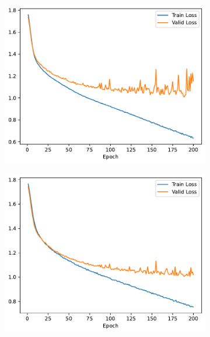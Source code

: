 \documentclass[a4paper, 12pt]{article}
\begin{document}
\begin{figure}[H]
    \centering
     \begin{subfigure}{0.30\textwidth}
        \includegraphics[width=\textwidth]{plot/mlp-training-loss-batch-64-lr-0.002-epochs-200-hidden-200-dropout-0.01-l2-0.0-layers-2-act-relu-opt-sgd-mom-0.0.pdf}
        \label{fig:lr_0.00}
    \end{subfigure}
    \hfill
    \begin{subfigure}{0.30
    \textwidth}
        \includegraphics[width=\textwidth]{plot/mlp-training-loss-batch-64-lr-0.002-epochs-200-hidden-200-dropout-0.25-l2-0.0-layers-2-act-relu-opt-sgd-mom-0.0.pdf}

\end{subfigure}
\end{figure}
\end{document}
